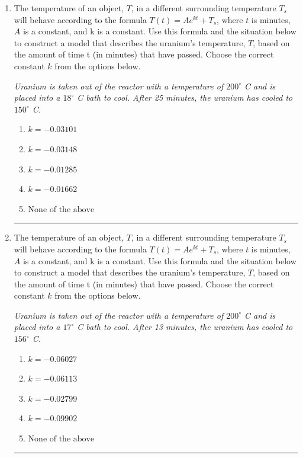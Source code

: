 \documentclass[14pt]{extbook}
\newcommand{\litem}[1]{\item#1\hspace*{-1cm}\rule{\textwidth}{0.4pt}}
\begin{document}
\begin{enumerate}
{\begin{enumerate}[label=\Alph*.]
\end{enumerate} }
\litem{
The temperature of an object, $T$, in a different surrounding temperature $T_s$ will behave according to the formula $T(t) = Ae^{kt} + T_s$, where $t$ is minutes, $A$ is a constant, and k is a constant. Use this formula and the situation below to construct a model that describes the uranium's temperature, $T$, based on the amount of time t (in minutes) that have passed. Choose the correct constant $k$ from the options below.
\begin{center}
    \textit{ Uranium is taken out of the reactor with a temperature of $200^{\circ}$ C and is placed into a $18^{\circ}$ C bath to cool. After 25 minutes, the uranium has cooled to $150^{\circ}$ C. }
\end{center}
\begin{enumerate}[label=\Alph*.]
\item \( k = -0.03101 \)
\item \( k = -0.03148 \)
\item \( k = -0.01285 \)
\item \( k = -0.01662 \)
\item \( \text{None of the above} \)

\end{enumerate} }
\litem{
The temperature of an object, $T$, in a different surrounding temperature $T_s$ will behave according to the formula $T(t) = Ae^{kt} + T_s$, where $t$ is minutes, $A$ is a constant, and k is a constant. Use this formula and the situation below to construct a model that describes the uranium's temperature, $T$, based on the amount of time t (in minutes) that have passed. Choose the correct constant $k$ from the options below.
\begin{center}
    \textit{ Uranium is taken out of the reactor with a temperature of $200^{\circ}$ C and is placed into a $17^{\circ}$ C bath to cool. After 13 minutes, the uranium has cooled to $156^{\circ}$ C. }
\end{center}
\begin{enumerate}[label=\Alph*.]
\item \( k = -0.06027 \)
\item \( k = -0.06113 \)
\item \( k = -0.02799 \)
\item \( k = -0.09902 \)
\item \( \text{None of the above} \)


\end{enumerate}}
\end{enumerate}
\end{document}
